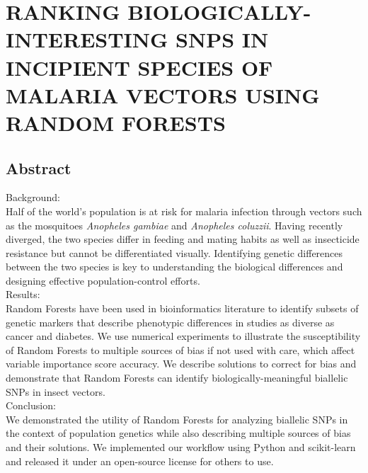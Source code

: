 \chapter{\uppercase{Ranking Biologically-Interesting SNPs in Incipient Species of Malaria Vectors using Random Forests}}

\section{Abstract}
  \noindent Background:\\
  Half of the world's population is at risk for malaria infection through vectors such as the mosquitoes \emph{Anopheles gambiae} and \emph{Anopheles coluzzii}.  Having recently diverged, the two species differ in feeding and mating habits as well as insecticide resistance but cannot be differentiated visually. Identifying genetic differences between the two species is key to understanding the biological differences and designing effective population-control efforts.\\
  
  \noindent Results:\\
  Random Forests have been used in bioinformatics literature to identify subsets of genetic markers that describe phenotypic differences in studies as diverse as cancer and diabetes. 
  We use numerical experiments to illustrate the susceptibility of Random Forests to multiple sources of bias if not used with care, which affect variable importance score accuracy.
  We describe solutions to correct for bias and demonstrate that Random Forests can identify biologically-meaningful biallelic SNPs in insect vectors.\\
  
  \noindent Conclusion:\\
  We demonstrated the utility of Random Forests for analyzing biallelic SNPs in the context of population genetics while also describing multiple sources of bias and their solutions.  We implemented our workflow using Python and scikit-learn and released it under an open-source license for others to use.

